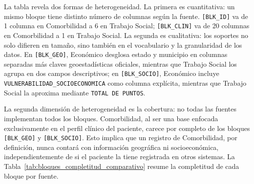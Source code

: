 La tabla revela dos formas de heterogeneidad. La primera es cuantitativa: un mismo bloque tiene distinto número de columnas según la fuente. \texttt{[BLK\_ID]} va de 1 columna en Comorbilidad a 6 en Trabajo Social; \texttt{[BLK\_CLIN]} va de 20 columnas en Comorbilidad a 1 en Trabajo Social. La segunda es cualitativa: los soportes no solo difieren en tamaño, sino también en el vocabulario y la granularidad de los datos. En \texttt{[BLK\_GEO]}, Económico desglosa estado y municipio en columnas separadas más claves geoestadísticas oficiales, mientras que Trabajo Social los agrupa en dos campos descriptivos; en \texttt{[BLK\_SOCIO]}, Económico incluye \texttt{VULNERABILIDAD\_SOCIOECONOMICA} como columna explícita, mientras que Trabajo Social la aproxima mediante \texttt{TOTAL DE PUNTOS}.

La segunda dimensión de heterogeneidad es la cobertura: no todas las fuentes implementan todos los bloques. Comorbilidad, al ser una base enfocada exclusivamente en el perfil clínico del paciente, carece por completo de los bloques \texttt{[BLK\_GEO]} y \texttt{[BLK\_SOCIO]}. Esto implica que un registro de Comorbilidad, por definición, nunca contará con información geográfica ni socioeconómica, independientemente de si el paciente la tiene registrada en otros sistemas. La Tabla~\ref{tab:bloques_completitud_comparativo} resume la completitud de cada bloque por fuente.

